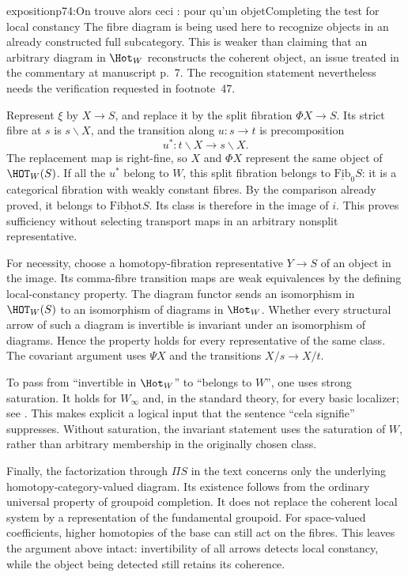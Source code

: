 \begin{dcomment}{exposition}{p74:On trouve alors ceci : pour qu'un objet}{Completing the test for local constancy}
The fibre diagram is being used here to recognize objects in an already constructed full subcategory. This is weaker than claiming that an arbitrary diagram in $\Hot_W$ reconstructs the coherent object, an issue treated in the commentary at manuscript p.~7. The recognition statement nevertheless needs the verification requested in footnote~47.

Represent $\xi$ by $X\to S$, and replace it by the split fibration $\Phi X\to S$. Its strict fibre at $s$ is $s\backslash X$, and the transition along $u:s\to t$ is precomposition
\[
 u^*:t\backslash X\longrightarrow s\backslash X.
\]
The replacement map is right-fine, so $X$ and $\Phi X$ represent the same object of $\HOT_W(S)$. If all the $u^*$ belong to $W$, this split fibration belongs to $\underline{\mathrm{Fib}}_0S$: it is a categorical fibration with weakly constant fibres. By the comparison already proved, it belongs to $\underline{\mathrm{Fibhot}}S$. Its class is therefore in the image of $i$. This proves sufficiency without selecting transport maps in an arbitrary nonsplit representative.

For necessity, choose a homotopy-fibration representative $Y\to S$ of an object in the image. Its comma-fibre transition maps are weak equivalences by the defining local-constancy property. The diagram functor sends an isomorphism in $\HOT_W(S)$ to an isomorphism of diagrams in $\Hot_W$. Whether every structural arrow of such a diagram is invertible is invariant under an isomorphism of diagrams. Hence the property holds for every representative of the same class. The covariant argument uses $\Psi X$ and the transitions $X/s\to X/t$.

To pass from ``invertible in $\Hot_W$'' to ``belongs to $W$'', one uses strong saturation. It holds for $W_\infty$ and, in the standard theory, for every basic localizer; see \citet[Proposition~4.2.4]{Cisinski2006Presheaves}. This makes explicit a logical input that the sentence ``cela signifie'' suppresses. Without saturation, the invariant statement uses the saturation of $W$, rather than arbitrary membership in the originally chosen class.

Finally, the factorization through $\Pi S$ in the text concerns only the underlying homotopy-category-valued diagram. Its existence follows from the ordinary universal property of groupoid completion. It does not replace the coherent local system by a representation of the fundamental groupoid. For space-valued coefficients, higher homotopies of the base can still act on the fibres. This leaves the argument above intact: invertibility of all arrows detects local constancy, while the object being detected still retains its coherence.
\end{dcomment}

